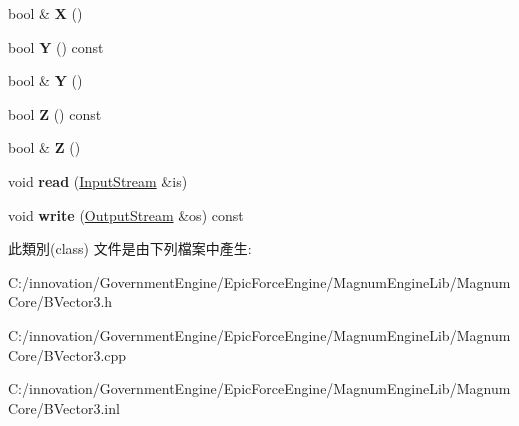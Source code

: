 \begin{DoxyCompactItemize}
\item 
bool \& {\bfseries X} ()\hypertarget{class_i_dream_sky_1_1_b_vector3_aef74d519d566781ecf16731ec780ced9}{}\label{class_i_dream_sky_1_1_b_vector3_aef74d519d566781ecf16731ec780ced9}

\item 
bool {\bfseries Y} () const \hypertarget{class_i_dream_sky_1_1_b_vector3_a850291699e1de0bb2be3fb62c01e7df6}{}\label{class_i_dream_sky_1_1_b_vector3_a850291699e1de0bb2be3fb62c01e7df6}

\item 
bool \& {\bfseries Y} ()\hypertarget{class_i_dream_sky_1_1_b_vector3_a5cc7a74a003b0d9a5c3c40f880d631ff}{}\label{class_i_dream_sky_1_1_b_vector3_a5cc7a74a003b0d9a5c3c40f880d631ff}

\item 
bool {\bfseries Z} () const \hypertarget{class_i_dream_sky_1_1_b_vector3_a059f531cd12fbe3bdbd6c98b67212752}{}\label{class_i_dream_sky_1_1_b_vector3_a059f531cd12fbe3bdbd6c98b67212752}

\item 
bool \& {\bfseries Z} ()\hypertarget{class_i_dream_sky_1_1_b_vector3_af88f472bcfaf97be0287bdd5cb014824}{}\label{class_i_dream_sky_1_1_b_vector3_af88f472bcfaf97be0287bdd5cb014824}

\item 
void {\bfseries read} (\hyperlink{class_i_dream_sky_1_1_input_stream}{Input\+Stream} \&is)\hypertarget{class_i_dream_sky_1_1_b_vector3_a8881ec8b7da37b0bfc59bf130bc4e447}{}\label{class_i_dream_sky_1_1_b_vector3_a8881ec8b7da37b0bfc59bf130bc4e447}

\item 
void {\bfseries write} (\hyperlink{class_i_dream_sky_1_1_output_stream}{Output\+Stream} \&os) const \hypertarget{class_i_dream_sky_1_1_b_vector3_a22885a622520182cacc957cb004d6bbe}{}\label{class_i_dream_sky_1_1_b_vector3_a22885a622520182cacc957cb004d6bbe}

\end{DoxyCompactItemize}


此類別(class) 文件是由下列檔案中產生\+:\begin{DoxyCompactItemize}
\item 
C\+:/innovation/\+Government\+Engine/\+Epic\+Force\+Engine/\+Magnum\+Engine\+Lib/\+Magnum\+Core/B\+Vector3.\+h\item 
C\+:/innovation/\+Government\+Engine/\+Epic\+Force\+Engine/\+Magnum\+Engine\+Lib/\+Magnum\+Core/B\+Vector3.\+cpp\item 
C\+:/innovation/\+Government\+Engine/\+Epic\+Force\+Engine/\+Magnum\+Engine\+Lib/\+Magnum\+Core/B\+Vector3.\+inl\end{DoxyCompactItemize}
